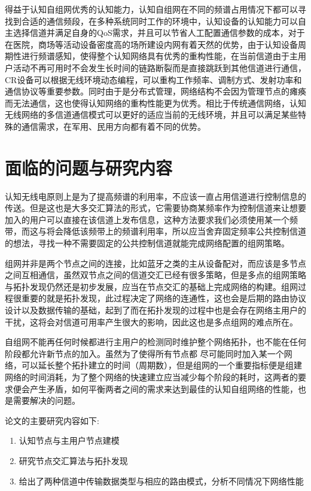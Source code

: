 \documentclass[a4paper,AutoFakeBold,oneside,12pt]{book}
\begin{document}
  得益于认知自组网优秀的认知能力，认知自组网在不同的频谱占用情况下都可以寻找到合适的通信频段，在多种系统同时工作的环境中，认知设备的认知能力可以自主选择信道并满足自身的QoS需求，并且可以节省人工配置通信参数的成本，对于在医院，商场等活动设备密度高的场所建设内网有着天然的优势，由于认知设备周期性进行频谱感知，使得整个认知网络具有优秀的重构性能，在当前信道由于主用户活动不再可用时不会发生长时间的链路断裂而是直接跳跃到其他信道进行通信，CR设备可以根据无线环境动态编程，可以重构工作频率、调制方式、发射功率和通信协议等重要参数。同时由于是分布式管理，网络结构不会因为管理节点的瘫痪而无法通信，这也使得认知网络的重构性能更为优秀。相比于传统通信网络，认知无线网络的多信道通信模式可以更好的适应当前的无线环境，并且可以满足某些特殊的通信需求，在军用、民用方向都有着不同的优势。

\section{面临的问题与研究内容}
  认知无线电原则上是为了提高频谱的利用率，不应该一直占用信道进行控制信息的传送。但是这也是大多交汇算法的形式，它需要协商某频率作为控制信道来让想要加入的用户可以直接在该信道上发布信息，这种方法要求我们必须使用某一个频带，而这与将会降低该频带上的频谱利用率，所以应当舍弃固定频率公共控制信道的想法，寻找一种不需要固定的公共控制信道就能完成网络配置的组网策略。

  组网并非是两个节点之间的连接，比如蓝牙之类的主从设备配对，而应该是多节点之间互相通信，虽然双节点之间的信道交汇已经有很多策略，但是多点的组网策略与拓扑发现仍然还是初步发展，应当在节点交汇的基础上完成网络的构建。组网过程很重要的就是拓扑发现，此过程决定了网络的连通性，这也会是后期的路由协议设计以及数据传输的基础，起到了而在拓扑发现的过程中也是会存在网络主用户的干扰，这将会对信道可用率产生很大的影响，因此这也是多点组网的难点所在。
 
 自组网不能再任何时候都进行主用户的检测同时维护整个网络拓扑，也不能在任何阶段都允许新节点的加入。虽然为了使得所有节点都 尽可能同时加入某一个网络，可以延长整个拓扑建立的时间（周期数），但是组网的一个重要指标便是组建网络的时间消耗，为了整个网络的快速建立应当减少每个阶段的耗时，这两者的要求便会产生矛盾，如何平衡两者之间的需求来达到最佳的认知自组网络的性能，也是需要解决的问题。

    论文的主要研究内容如下:
\begin{enumerate}[\indent (1)] %
\item 认知节点与主用户节点建模
\item  研究节点交汇算法与拓扑发现
\item  给出了两种信道中传输数据类型与相应的路由模式，分析不同情况下网络性能
\end{enumerate}
\end{document}
